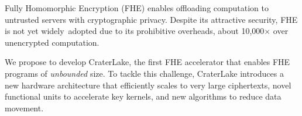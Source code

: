 Fully Homomorphic Encryption (FHE) enables offloading computation to untrusted
servers with cryptographic privacy. Despite its attractive security, FHE is not
yet widely~adopted due to its prohibitive overheads, about 10,000$\times$ over
unencrypted computation.

We propose to develop CraterLake, the first FHE accelerator that enables FHE programs of
\emph{unbounded} size. To
tackle this challenge, CraterLake introduces a new hardware architecture that
efficiently scales to very large ciphertexts, novel functional units to
accelerate key kernels, and new algorithms to reduce
data movement.
